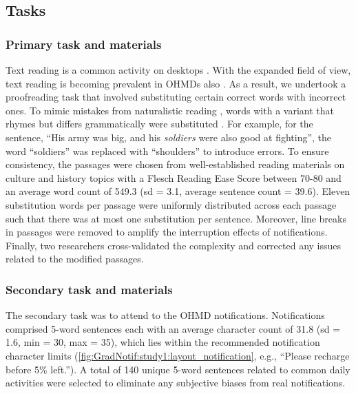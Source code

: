 \subsection{Tasks}
\label{sec:GradNotif:study1:task}

\subsubsection*{Primary task and materials}
\label{sec:GradNotif:study1:task_primary}

Text reading is a common activity on desktops \cite{bernard_comparing_2003, buchner_advantage_2009}. With the expanded field of view, text reading is becoming prevalent in OHMDs also \cite{rau_speed_2018, rzayev_reading_2018, klose_text_2019}.
As a result, we undertook a proofreading task that involved substituting certain correct words with incorrect ones. To mimic mistakes from naturalistic reading \cite{jorna_image_1991}, words with a variant that rhymes but differs grammatically were substituted \cite{jankowski_integrating_2010, bernard_comparing_2003, darroch_effect_2005, gujar_comparative_1998}. For example, for the sentence, ``His army was big, and his \emph{soldiers} were also good at fighting'', the word ``soldiers'' was replaced with ``shoulders'' to introduce errors.
To ensure consistency, the passages were chosen from well-established reading materials \cite{quinn1974speed, millett_new_2017} on culture and history topics with a Flesch Reading Ease Score between 70-80 and an average word count of 549.3 (sd = 3.1, average sentence count = 39.6). Eleven substitution words per passage were uniformly distributed across each passage such that there was at most one substitution per sentence.
Moreover, line breaks in passages were removed to amplify the interruption effects of notifications.
Finally, two researchers cross-validated the complexity and corrected any issues related to the modified passages.





\subsubsection*{Secondary task and materials}
\label{sec:GradNotif:study1:task_secondary}

The secondary task was to attend to the OHMD notifications. Notifications comprised 5-word sentences each with an average character count of 31.8 (sd = 1.6, min = 30, max = 35), which lies within the recommended notification character limits \cite{google_material_2022} (\autoref{fig:GradNotif:study1:layout_notification}, e.g., ``Please recharge before 5\% left.''). A total of 140 unique 5-word sentences related to common daily activities \cite{nyelveszleny_english_2022} were selected to eliminate any subjective biases from real notifications.


